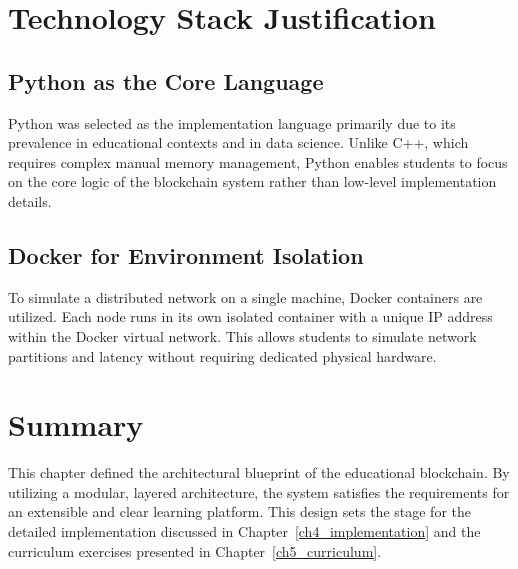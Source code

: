 \section{Technology Stack Justification} \label{ch3_tech_stack}

\subsection{Python as the Core Language}
Python was selected as the implementation language primarily due to its prevalence in educational contexts and in data science. Unlike C++, which requires complex manual memory management, Python enables students to focus on the core logic of the blockchain system rather than low-level implementation details.

\subsection{Docker for Environment Isolation}
To simulate a distributed network on a single machine, Docker containers are utilized. Each node runs in its own isolated container with a unique IP address within the Docker virtual network. This allows students to simulate network partitions and latency without requiring dedicated physical hardware.

\section{Summary}
This chapter defined the architectural blueprint of the educational blockchain. By utilizing a modular, layered architecture, the system satisfies the requirements for an extensible and clear learning platform. This design sets the stage for the detailed implementation discussed in Chapter~\ref{ch4_implementation} and the curriculum exercises presented in Chapter~\ref{ch5_curriculum}.